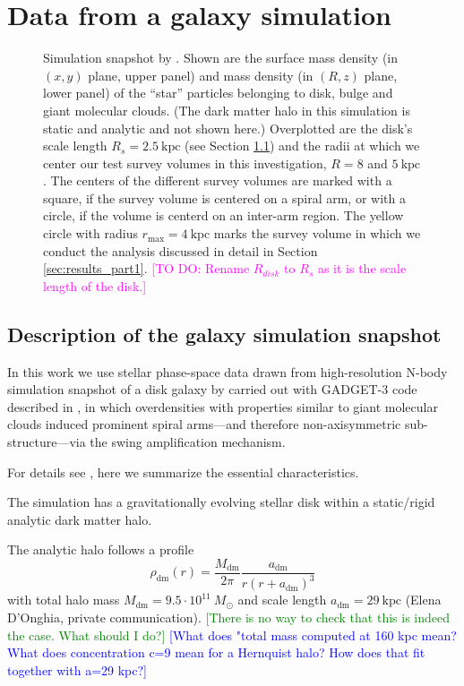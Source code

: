 \documentclass[iop,revtex4,numberedappendix,appendixfloats]{emulateapj}
\newcommand{\Wilma}[1]{\textcolor{Magenta}{#1}}
\newcommand{\HW}[1]{\textcolor{Green}{#1}}
\newcommand{\Jo}[1]{\textcolor{Blue}{#1}}
\begin{document}
\section{Data from a galaxy simulation} \label{sec:simulation}

\begin{figure}[!htbp]
\caption{Simulation snapshot by \citet{2013ApJ...766...34D} . Shown are the surface mass density (in $(x,y)$ plane, upper panel) and mass density (in $(R,z)$ plane, lower panel) of the ``star'' particles belonging to disk, bulge and giant molecular clouds. (The dark matter halo in this simulation is static and analytic and not shown here.) Overplotted are the disk's scale length $R_s=2.5~\text{kpc}$ (see Section \ref{sec:simulation_description}) and the radii at which we center our test survey volumes in this investigation, $R=8$ and $5~\text{kpc}$. The centers of the different survey volumes are marked with a square, if the survey volume is centered on a spiral arm, or with a circle, if the volume is centerd on an inter-arm region. The yellow circle with radius $r_\text{max}=4~\text{kpc}$ marks the survey volume in which we conduct the analysis discussed in detail in Section \ref{sec:results_part1}. \Wilma{[TO DO: Rename $R_{disk}$ to $R_s$ as it is the scale length of the disk.]}}
\label{fig:simulation}
\end{figure}

\subsection{Description of the galaxy simulation snapshot} \label{sec:simulation_description}

In this work we use stellar phase-space data drawn from high-resolution N-body simulation snapshot of a disk galaxy by \citet{2013ApJ...766...34D} carried out with GADGET-3 code described in \citet{2005MNRAS.361..776S}, in which overdensities with properties similar to giant molecular clouds induced prominent spiral arms---and therefore non-axisymmetric sub-structure---via the swing amplification mechanism. 

For details see \citet{2013ApJ...766...34D}, here we summarize the essential characteristics.

The simulation has a gravitationally evolving stellar disk within a static/rigid analytic dark matter halo.

The analytic halo follows a \citet{1990ApJ...356..359H} profile
\begin{equation}
\rho_\text{dm}(r) = \frac{M_\text{dm}}{2\pi} \frac{a_\text{dm}}{r (r+a_\text{dm})^3} \label{eq:dm_hernquist}
\end{equation}
with total halo mass $M_\text{dm} = 9.5\cdot 10^{11} ~M_\odot$ and scale length $a_\text{dm} = 29~\text{kpc}$ (Elena D'Onghia, private communication). \HW{[There is no way to check that this is indeed the case. What should I do?]} \Jo{[What does "total mass computed at 160 kpc mean? What does concentration c=9 mean for a Hernquist halo? How does that fit together with a=29 kpc?]}
\end{document}

